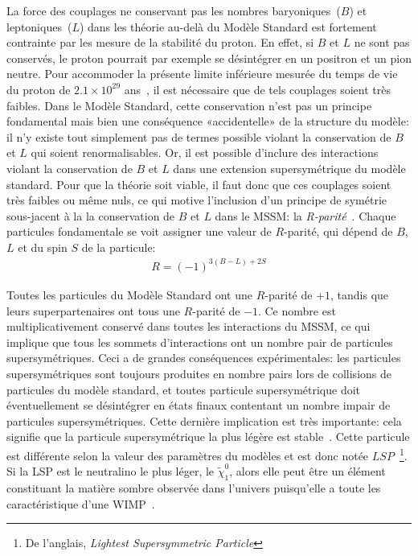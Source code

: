 La force des couplages ne conservant pas les nombres baryoniques~($B$)
et leptoniques~($L$) dans les théorie au-delà du Modèle Standard est
fortement contrainte par les mesure de la stabilité du proton. En
effet, si $B$ et $L$ ne sont pas conservés, le proton pourrait par
exemple se désintégrer en un positron et un pion neutre. Pour
accommoder la présente limite inférieure mesurée du temps de vie du
proton de $2.1 \times 10^{29}$
ans~\cite{Ahmed:2003sy}, il est nécessaire que de
tels couplages soient très faibles.  Dans le Modèle Standard, cette
conservation n'est pas un principe fondamental mais bien une
conséquence «accidentelle» de la structure du modèle: il n'y existe
tout simplement pas de termes possible violant la conservation de $B$
et $L$ qui soient renormalisables. Or, il est possible d'inclure des
interactions violant la conservation de $B$ et $L$ dans une extension
supersymétrique du modèle standard. Pour que la théorie soit viable,
il faut donc que ces couplages soient très faibles ou même nuls, ce qui
motive l'inclusion d'un principe de symétrie sous-jacent à la la
conservation de $B$ et $L$ dans le MSSM: la
\emph{R-parité}~\cite{martin_supersymmetry_1997}. Chaque particules
fondamentale se voit assigner une valeur de $R$-parité, qui dépend de
$B$, $L$ et du spin $S$ de la particule:
\begin{eqnarray}
  R = (-1)^{3(B - L) + 2S}
\end{eqnarray}

Toutes les particules du Modèle Standard ont une $R$-parité de $+1$,
tandis que leurs superpartenaires ont tous une $R$-parité de $-1$. Ce
nombre est multiplicativement conservé dans toutes les interactions du
MSSM, ce qui implique que tous les sommets d'interactions ont un
nombre pair de particules supersymétriques. Ceci a de grandes
conséquences exp\'erimentales: les particules supersymétriques sont
toujours produites en nombre pairs lors de collisions de particules du
modèle standard, et toutes particule supersymétrique doit éventuellement se
désintégrer en états finaux contentant un nombre impair de particules
supersymétriques. Cette dernière implication est très importante:
cela signifie que la particule supersymétrique la plus légère est
stable~\cite{martin_supersymmetry_1997}. Cette particule est
différente selon la valeur des paramètres du modèles et est donc notée
$LSP$~\footnote{De l'anglais, \emph{Lightest Supersymmetric
    Particle}}. Si la LSP est le neutralino le plus léger, le
$\tilde{\chi}_1^0$, alors elle peut être un élément constituant la matière
sombre observée dans l'univers puisqu'elle a toute les caractéristique
d'une WIMP~\cite{olive_review_2014}.

